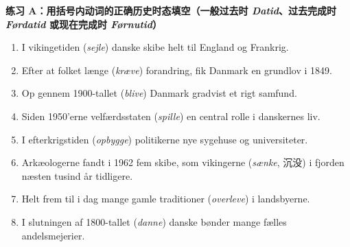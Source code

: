 \textbf{练习 A：用括号内动词的正确历史时态填空（一般过去时 \textit{Datid}、过去完成时 \textit{Førdatid} 或现在完成时 \textit{Førnutid}）}
\begin{enumerate}
  \item I vikingetiden \underline{\hspace{2.2cm}} (\textit{sejle}) danske skibe helt til England og Frankrig.
  \item Efter at folket længe \underline{\hspace{2.6cm}} (\textit{kræve}) forandring, fik Danmark en grundlov i 1849.
  \item Op gennem 1900-tallet \underline{\hspace{2.4cm}} (\textit{blive}) Danmark gradvist et rigt samfund.
  \item Siden 1950'erne \underline{\hspace{1.4cm}} velfærdsstaten \underline{\hspace{2.2cm}} (\textit{spille}) en central rolle i danskernes liv.
  \item I efterkrigstiden \underline{\hspace{2.2cm}} (\textit{opbygge}) politikerne nye sygehuse og universiteter.
  \item Arkæologerne fandt i 1962 fem skibe, som vikingerne \underline{\hspace{2.6cm}} (\textit{sænke}, 沉没) i fjorden næsten tusind år tidligere.
  \item Helt frem til i dag \underline{\hspace{1.4cm}} mange gamle traditioner \underline{\hspace{2.2cm}} (\textit{overleve}) i landsbyerne.
  \item I slutningen af 1800-tallet \underline{\hspace{2.2cm}} (\textit{danne}) danske bønder mange fælles andelsmejerier.
\end{enumerate}

